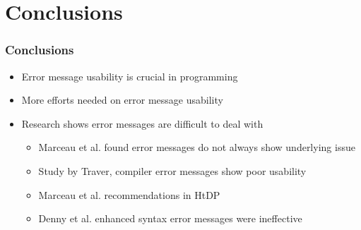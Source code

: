 \documentclass{beamer}
\begin{document}
\section[Conclusions]{Conclusions}

\begin{frame}
	\frametitle{Conclusions}
		\begin{itemize}
			\item Error message usability is crucial in programming
			\item More efforts needed on error message usability
			\item Research shows error messages are difficult to deal with
			\begin{itemize}
				\item Marceau et al. found error messages do not always show underlying issue
				\item Study by Traver, compiler error messages show poor usability
				\item Marceau et al. recommendations in HtDP
				\item Denny et al. enhanced syntax error messages were ineffective
			\end{itemize}
		\end{itemize}

\end{frame}



\end{document}
